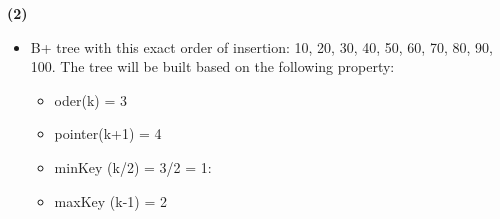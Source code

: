 \documentclass[a4paper, 11pt]{article}
\renewcommand{\part}[1] {\vspace{.10in} {\bf (#1)}}
\begin{document}
\part{2} 
\begin{itemize}
\item B+  tree with this exact order of insertion: 10, 20, 30, 40, 50, 60, 70, 80, 90, 100.
The tree will be built based on the following property:
\begin{itemize}
\item oder(k) = 3
\item pointer(k+1) = 4
\item minKey (k/2) = 3/2 = 1:
\item maxKey (k-1) = 2 




\begin{tikzpicture}[x=0.75pt,y=0.75pt,yscale=-1,xscale=1]


\end{tikzpicture}
\end{itemize}
\end{itemize}
\end{document}

